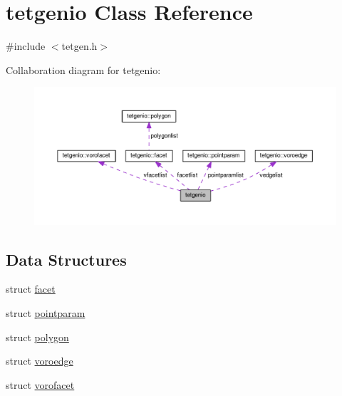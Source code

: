 \hypertarget{classtetgenio}{}\section{tetgenio Class Reference}
\label{classtetgenio}


{\ttfamily \#include $<$tetgen.\+h$>$}



Collaboration diagram for tetgenio\+:
\nopagebreak
\begin{figure}[H]
\begin{center}
\leavevmode
\includegraphics[width=350pt]{classtetgenio__coll__graph}
\end{center}
\end{figure}
\subsection*{Data Structures}
\begin{DoxyCompactItemize}
\item 
struct \hyperlink{structtetgenio_1_1facet}{facet}
\item 
struct \hyperlink{structtetgenio_1_1pointparam}{pointparam}
\item 
struct \hyperlink{structtetgenio_1_1polygon}{polygon}
\item 
struct \hyperlink{structtetgenio_1_1voroedge}{voroedge}
\item 
struct \hyperlink{structtetgenio_1_1vorofacet}{vorofacet}
\end{DoxyCompactItemize}
